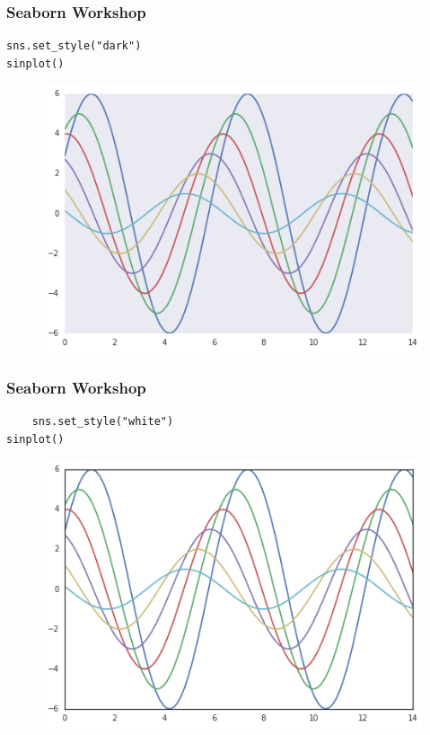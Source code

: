 \documentclass{beamer}
\begin{document}
\begin{frame}[fragile]
	\frametitle{Seaborn Workshop}
	\large
\begin{verbatim}
sns.set_style("dark")
sinplot()
\end{verbatim}
\begin{figure}
\centering
\includegraphics[width=0.7\linewidth]{images/aesthetics_15_0}
\end{figure}

\end{frame}
\begin{frame}[fragile]
	\frametitle{Seaborn Workshop}
	\large
\begin{verbatim}
	sns.set_style("white")
sinplot()
\end{verbatim}
\begin{figure}
\centering
\includegraphics[width=0.7\linewidth]{images/aesthetics_17_0}
\caption{}
\label{fig:aesthetics_17_0}
\end{figure}


\end{frame}
\end{document}
